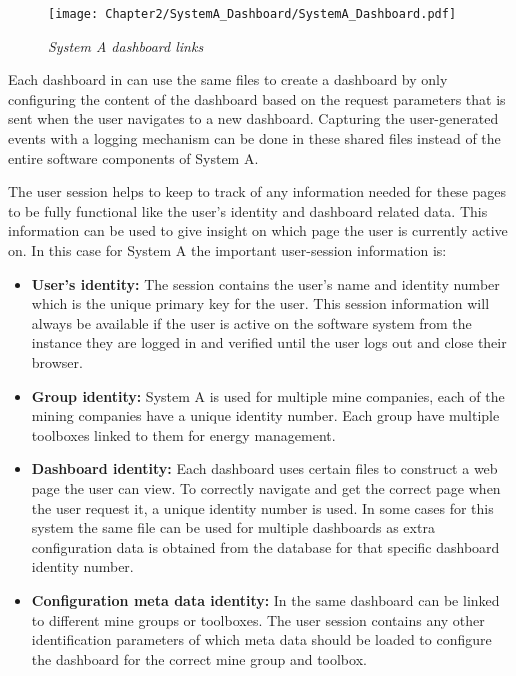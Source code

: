 \begin{figure}[!htb] %
	\centering %
	\texttt{[image: Chapter2/SystemA\_Dashboard/SystemA\_Dashboard.pdf]}
	\caption[System A dashboard links]
	{\textit{System A dashboard links}}\label{fig:ch2_SystemA_Dashboard}
\end{figure}

\clearpage

Each dashboard in  can use the same files to create a dashboard by only configuring the content of the dashboard based on the request parameters that is sent when the user navigates to a new dashboard. Capturing the user-generated events with a logging mechanism can be done in these shared files instead of the entire software components of System A.\par The user session helps to keep to track of any information needed for these pages to be fully functional like the user's identity and dashboard related data. This information can be used to give insight on which page the user is currently active on. In this case for System A the important user-session information is:

\begin{itemize}
	\item \textbf{User's identity:} The session contains the user's name and identity number which is the unique primary key for the user. This session information will always be available if the user is active on the software system from the instance they are logged in and verified until the user logs out and close their browser.
	\item \textbf{Group identity:} System A is used for multiple mine companies, each of the mining companies have a unique identity number. Each group have multiple toolboxes linked to them for energy management.
	\item \textbf{Dashboard identity:} Each dashboard uses certain files to construct a web page the user can view. To correctly navigate and get the correct page when the user request it, a unique identity number is used. In some cases for this system the same file can be used for multiple dashboards as extra configuration data is obtained from the database for that specific dashboard identity number.
	\item \textbf{Configuration meta data identity:} In  the same dashboard can be linked to different mine groups or toolboxes. The user session contains any other identification parameters of which meta data should be loaded to configure the dashboard for the correct mine group and toolbox.
\end{itemize}


